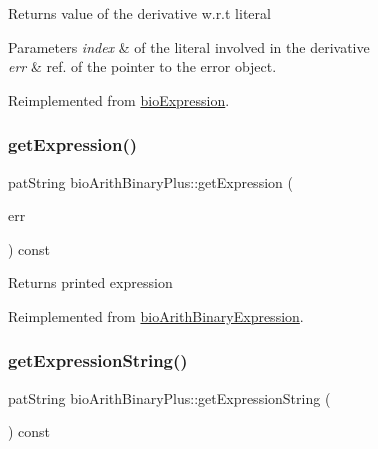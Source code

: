 \begin{DoxyReturn}{Returns}
value of the derivative w.\+r.\+t literal 
\end{DoxyReturn}

\begin{DoxyParams}{Parameters}
{\em index} & of the literal involved in the derivative \\
\hline
{\em err} & ref. of the pointer to the error object. \\
\hline
\end{DoxyParams}


Reimplemented from \hyperlink{classbio_expression_a5915579d1193f25f216c1e273c97f2ce}{bio\+Expression}.

\mbox{\label{classbio_arith_binary_plus_afb38f58cc62bf6fbce4383ce40b1aecf}} 
\subsubsection{\texorpdfstring{get\+Expression()}{getExpression()}}
{\footnotesize\ttfamily pat\+String bio\+Arith\+Binary\+Plus\+::get\+Expression (\begin{DoxyParamCaption}\item[{pat\+Error $\ast$\&}]{err }\end{DoxyParamCaption}) const\hspace{0.3cm}{\ttfamily [virtual]}}

\begin{DoxyReturn}{Returns}
printed expression 
\end{DoxyReturn}


Reimplemented from \hyperlink{classbio_arith_binary_expression_a6c48d0f1c7b6ba1b8cf3910b9ad04f93}{bio\+Arith\+Binary\+Expression}.

\mbox{\label{classbio_arith_binary_plus_af062d1a1394e9fedf99e23911110f384}} 
\subsubsection{\texorpdfstring{get\+Expression\+String()}{getExpressionString()}}
{\footnotesize\ttfamily pat\+String bio\+Arith\+Binary\+Plus\+::get\+Expression\+String (\begin{DoxyParamCaption}{ }\end{DoxyParamCaption}) const\hspace{0.3cm}{\ttfamily [virtual]}}

